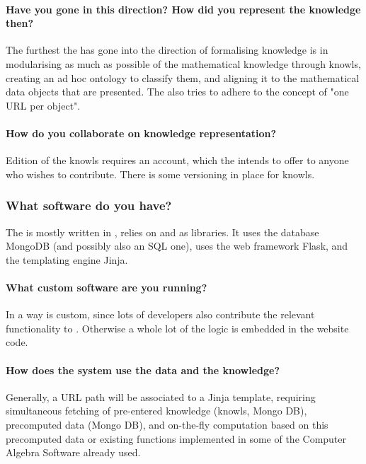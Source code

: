 \paragraph{Have you gone in this direction? How did you represent the knowledge then?}

The furthest the \LMFDB has gone into the direction of formalising knowledge is in modularising as much as possible of the mathematical knowledge through knowls, creating an ad hoc ontology to classify them, and aligning it to the mathematical data objects that are presented. The \LMFDB also tries to adhere to the concept of "one URL per object".

\paragraph{How do you collaborate on knowledge representation?}

Edition of the knowls requires an account, which the \LMFDB intends to offer to anyone who wishes to contribute. There is some versioning in place for knowls.

\subsubsection{What software do you have?}

 The \LMFDB is mostly written in \python, relies on \SageMath and \PariGP as libraries. It uses the database MongoDB (and possibly also an SQL one), uses the web framework Flask, and the templating engine Jinja.

 \paragraph{What custom software are you running?}

In a way \SageMath is custom, since lots of \LMFDB developers also contribute the relevant functionality to \SageMath. Otherwise a whole lot of the logic is embedded in the website code.

 \paragraph{How does the system use the data and the knowledge?}
Generally, a URL path will be associated to a Jinja template, requiring simultaneous fetching of pre-entered knowledge (knowls, Mongo DB), precomputed data (Mongo DB), and on-the-fly computation based on this precomputed data or existing functions implemented in some of the Computer Algebra Software already used.

